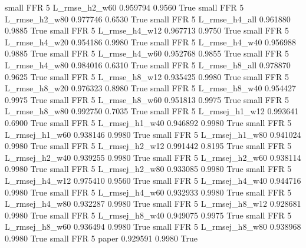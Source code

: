     small      FFR                 5  L_rmse_h2_w60   0.959794      0.9560    True
     small      FFR                 5  L_rmse_h2_w80   0.977746      0.6530    True
     small      FFR                 5  L_rmse_h4_all   0.961880      0.9885    True
     small      FFR                 5  L_rmse_h4_w12   0.967713      0.9750    True
     small      FFR                 5  L_rmse_h4_w20   0.954186      0.9980    True
     small      FFR                 5  L_rmse_h4_w40   0.956988      0.9885    True
     small      FFR                 5  L_rmse_h4_w60   0.952768      0.9855    True
     small      FFR                 5  L_rmse_h4_w80   0.984016      0.6310    True
     small      FFR                 5  L_rmse_h8_all   0.978870      0.9625    True
     small      FFR                 5  L_rmse_h8_w12   0.935425      0.9980    True
     small      FFR                 5  L_rmse_h8_w20   0.976323      0.8980    True
     small      FFR                 5  L_rmse_h8_w40   0.954427      0.9975    True
     small      FFR                 5  L_rmse_h8_w60   0.951813      0.9975    True
     small      FFR                 5  L_rmse_h8_w80   0.992750      0.7035    True
     small      FFR                 5 L_rmsej_h1_w12   0.993641      0.6900    True
     small      FFR                 5 L_rmsej_h1_w40   0.946892      0.9980    True
     small      FFR                 5 L_rmsej_h1_w60   0.938146      0.9980    True
     small      FFR                 5 L_rmsej_h1_w80   0.941024      0.9980    True
     small      FFR                 5 L_rmsej_h2_w12   0.991442      0.8195    True
     small      FFR                 5 L_rmsej_h2_w40   0.939255      0.9980    True
     small      FFR                 5 L_rmsej_h2_w60   0.938114      0.9980    True
     small      FFR                 5 L_rmsej_h2_w80   0.933085      0.9980    True
     small      FFR                 5 L_rmsej_h4_w12   0.975410      0.9560    True
     small      FFR                 5 L_rmsej_h4_w40   0.944716      0.9980    True
     small      FFR                 5 L_rmsej_h4_w60   0.932933      0.9980    True
     small      FFR                 5 L_rmsej_h4_w80   0.932287      0.9980    True
     small      FFR                 5 L_rmsej_h8_w12   0.928681      0.9980    True
     small      FFR                 5 L_rmsej_h8_w40   0.949075      0.9975    True
     small      FFR                 5 L_rmsej_h8_w60   0.936494      0.9980    True
     small      FFR                 5 L_rmsej_h8_w80   0.938968      0.9980    True
     small      FFR                 5          paper   0.929591      0.9980    True
